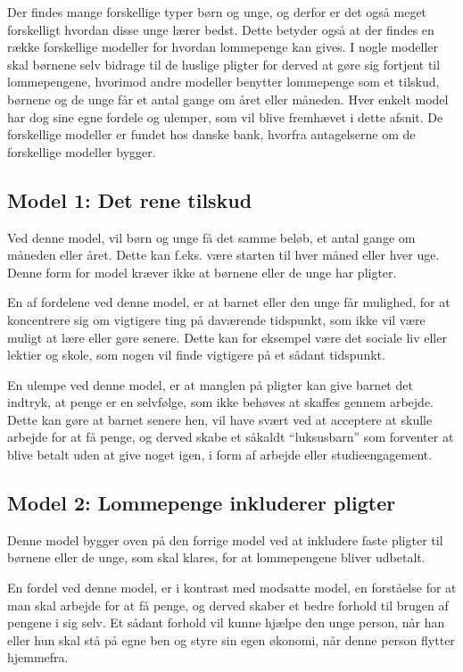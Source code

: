 Der findes mange forskellige typer børn og unge, 
og derfor er det også meget forskelligt hvordan 
disse unge lærer bedst. Dette betyder også at 
der findes en række forskellige modeller for 
hvordan lommepenge kan gives. I nogle modeller 
skal børnene selv bidrage til de huslige pligter 
for derved at gøre sig fortjent til 
lommepengene, hvorimod andre modeller benytter 
lommepenge som et tilskud, børnene og de unge 
får et antal gange om året eller måneden. Hver 
enkelt model har dog sine egne fordele og 
ulemper, som vil blive fremhævet i dette afsnit. 
De forskellige modeller er fundet hos danske 
bank, hvorfra antagelserne om de forskellige 
modeller bygger\cite{DanskeB2}\cite{DanskeB3}.

\subsection{Model 1: Det rene tilskud}
Ved denne model, vil børn og unge få det samme 
beløb, et antal gange om måneden eller året. 
Dette kan f.eks. være starten til hver måned 
eller hver uge. Denne form for model kræver ikke 
at børnene eller de unge har pligter.

En af fordelene ved denne model, er at barnet 
eller den unge får mulighed, for at koncentrere 
sig om vigtigere ting på daværende tidspunkt, 
som ikke vil være muligt at lære eller gøre 
senere. Dette kan for eksempel være det sociale 
liv eller lektier og skole, som nogen vil finde 
vigtigere på et sådant tidspunkt.

En ulempe ved denne model, er at manglen på 
pligter kan give barnet det indtryk, at penge er 
en selvfølge, som ikke behøves at skaffes gennem 
arbejde. Dette kan gøre at barnet senere hen, 
vil have svært ved at acceptere at skulle 
arbejde for at få penge, og derved skabe et 
såkaldt “luksusbarn” som forventer at blive 
betalt uden at give noget igen, i form af 
arbejde eller studieengagement.

\subsection{Model 2: Lommepenge inkluderer 
pligter}
Denne model bygger oven på den forrige model ved 
at inkludere faste pligter til børnene eller de 
unge, som skal klares, for at lommepengene 
bliver udbetalt.

En fordel ved denne model, er i kontrast med 
modsatte model, en forståelse for at man skal 
arbejde for at få penge, og derved skaber et 
bedre forhold til brugen af pengene i sig selv. 
Et sådant forhold vil kunne hjælpe den unge 
person, når han eller hun skal stå på egne ben 
og styre sin egen økonomi, når denne person 
flytter hjemmefra.

